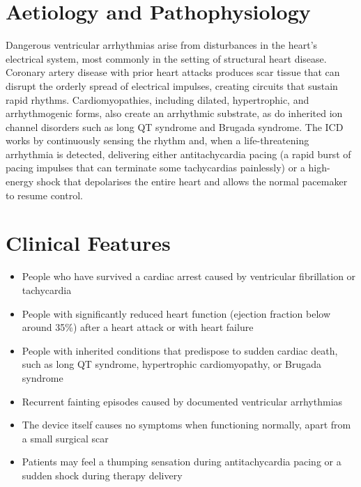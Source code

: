 \section*{Aetiology and Pathophysiology}
Dangerous ventricular arrhythmias arise from disturbances in the heart's electrical system, most commonly in the setting of structural heart disease. Coronary artery disease with prior heart attacks produces scar tissue that can disrupt the orderly spread of electrical impulses, creating circuits that sustain rapid rhythms. Cardiomyopathies, including dilated, hypertrophic, and arrhythmogenic forms, also create an arrhythmic substrate, as do inherited ion channel disorders such as long QT syndrome and Brugada syndrome. The ICD works by continuously sensing the rhythm and, when a life-threatening arrhythmia is detected, delivering either antitachycardia pacing (a rapid burst of pacing impulses that can terminate some tachycardias painlessly) or a high-energy shock that depolarises the entire heart and allows the normal pacemaker to resume control.

\section*{Clinical Features}
\begin{itemize}
    \item People who have survived a cardiac arrest caused by ventricular fibrillation or tachycardia
    \item People with significantly reduced heart function (ejection fraction below around 35\%) after a heart attack or with heart failure
    \item People with inherited conditions that predispose to sudden cardiac death, such as long QT syndrome, hypertrophic cardiomyopathy, or Brugada syndrome
    \item Recurrent fainting episodes caused by documented ventricular arrhythmias
    \item The device itself causes no symptoms when functioning normally, apart from a small surgical scar
    \item Patients may feel a thumping sensation during antitachycardia pacing or a sudden shock during therapy delivery
\end{itemize}

